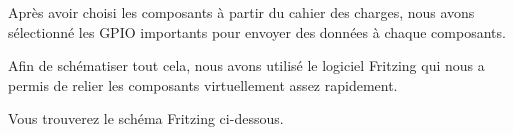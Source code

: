 Après avoir choisi les composants à partir du cahier des charges, nous avons sélectionné les GPIO importants pour envoyer des données à chaque composants.

Afin de schématiser tout cela, nous avons utilisé le logiciel Fritzing qui nous a permis de relier les composants virtuellement assez rapidement.

Vous trouverez le schéma Fritzing ci-dessous.